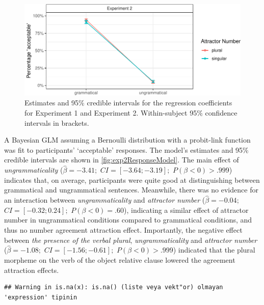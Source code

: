 \documentclass[
  english,
  doc,floatsintext]{apa6}
\begin{document}
\begin{figure}
\centering
\includegraphics{ongoing_paper_files/figure-latex/exp2AvgResponse-1.pdf}
\caption{\label{fig:exp2AvgResponse}Estimates and 95\% credible intervals for the regression coefficients for Experiment 1 and Experiment 2. Within-subject 95\% confidence intervals in brackets.}
\end{figure}

A Bayesian GLM assuming a Bernoulli distribution with a probit-link function was fit to participants' `acceptable' responses. The model's estimates and 95\% credible intervals are shown in \ref{fig:exp2ResponseModel}.
The main effect of \textit{ungrammaticality} (\(\hat{\beta}=-3.41;\) \(CI=[-3.64; -3.19];\) \(P(\beta<0)> .999\)) indicates that,
on average, participants were quite good at distinguishing between grammatical and ungrammatical sentences.
Meanwhile, there was no evidence for an interaction between \textit{ungrammaticality} and \textit{attractor number} (\(\hat{\beta}=-0.04;\) \(CI=[-0.32; 0.24];\) \(P(\beta<0)= .60\)), indicating
a similar effect of attractor number in ungrammatical conditions compared to grammatical conditions, and thus no number agreement attraction effect.
Importantly, the negative effect between \textit{the presence of the verbal plural}, \textit{ungrammaticality} and \textit{attractor number} (\(\hat{\beta}=-1.08;\) \(CI=[-1.56; -0.61];\) \(P(\beta<0)> .999\)) indicated that the plural morpheme on the verb of the object relative clause lowered the agreement attraction effects.

\begin{verbatim}
## Warning in is.na(x): is.na() (liste veya vekt"or) olmayan 'expression' tipinin
\end{verbatim}
\end{document}
